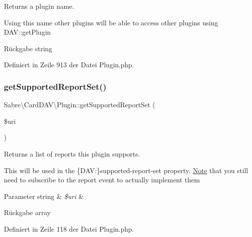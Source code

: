 Returns a plugin name.

Using this name other plugins will be able to access other plugins using D\+AV\+::get\+Plugin

\begin{DoxyReturn}{Rückgabe}
string 
\end{DoxyReturn}


Definiert in Zeile 913 der Datei Plugin.\+php.

\mbox{\label{class_sabre_1_1_card_d_a_v_1_1_plugin_a0feb5a070f030e514ded0b06b2252a83}} 
\subsubsection{\texorpdfstring{get\+Supported\+Report\+Set()}{getSupportedReportSet()}}
{\footnotesize\ttfamily Sabre\textbackslash{}\+Card\+D\+A\+V\textbackslash{}\+Plugin\+::get\+Supported\+Report\+Set (\begin{DoxyParamCaption}\item[{}]{\$uri }\end{DoxyParamCaption})}

Returns a list of reports this plugin supports.

This will be used in the \{D\+AV\+:\}supported-\/report-\/set property. \mbox{\hyperlink{class_note}{Note}} that you still need to subscribe to the \textquotesingle{}report\textquotesingle{} event to actually implement them


\begin{DoxyParams}[1]{Parameter}
string & {\em \$uri} & \\
\hline
\end{DoxyParams}
\begin{DoxyReturn}{Rückgabe}
array 
\end{DoxyReturn}


Definiert in Zeile 118 der Datei Plugin.\+php.

\mbox{\label{class_sabre_1_1_card_d_a_v_1_1_plugin_a7cf2bf1fc6f4069876ac83e597d98df9}} 

